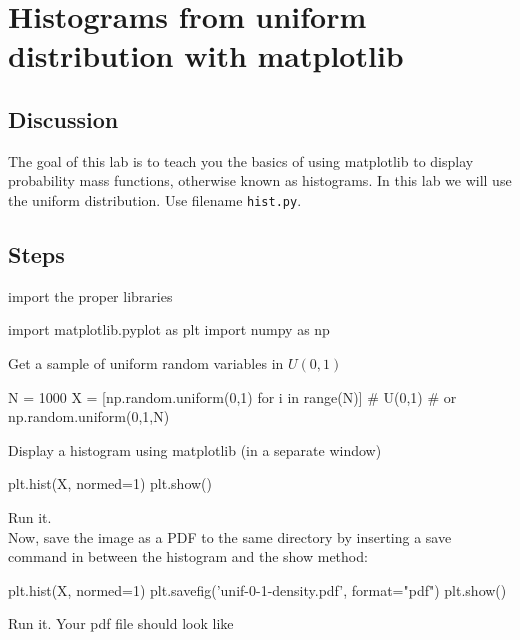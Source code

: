 \chapter{Histograms from uniform distribution with matplotlib}

\setcounter{problem}{1}
\section{Discussion}

\begin{fullwidth}


The goal of this lab is to teach you the basics of using matplotlib to display probability mass functions, otherwise known as histograms. In this lab we will use the uniform distribution. Use filename {\tt hist.py}.

\section{Steps}

\step  import the proper libraries

\begin{pyverbatim}
import matplotlib.pyplot as plt
import numpy as np
\end{pyverbatim}

\step Get a sample of uniform random variables in $U(0,1)$

\begin{pyverbatim}
N = 1000
X = [np.random.uniform(0,1) for i in range(N)] # U(0,1)
# or np.random.uniform(0,1,N)
\end{pyverbatim}

\step Display a histogram using matplotlib (in a separate window)

\begin{pyverbatim}
plt.hist(X, normed=1)
plt.show()
\end{pyverbatim}

\step Run it. \\

\step Now, save the image as a PDF to the same directory by inserting a save command in between the histogram and the show method:

\begin{pyverbatim}
plt.hist(X, normed=1)
plt.savefig('unif-0-1-density.pdf', format="pdf")
plt.show()
\end{pyverbatim}

\step Run it. Your pdf file should look like


\end{fullwidth}

